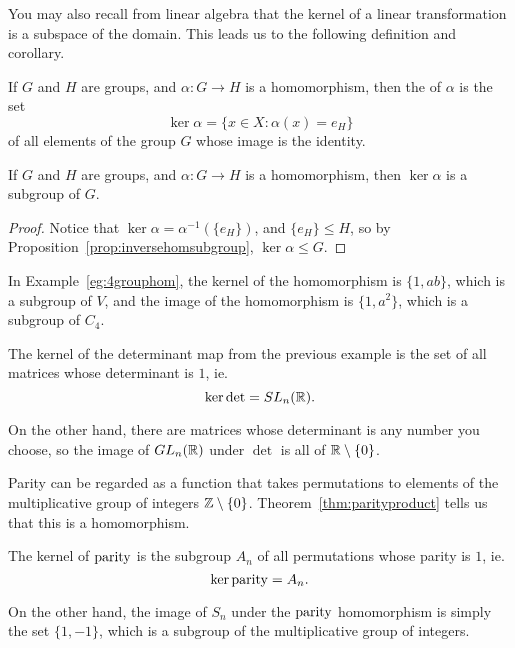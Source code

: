 You may also recall from linear algebra that the kernel of a linear
transformation is a subspace of the domain.  This leads us to the
following definition and corollary.

\begin{definition}
  If $G$ and $H$ are groups, and $\alpha: G \to H$ is a homomorphism, 
  then the  of $\alpha$ is the set
  \[
    \ker \alpha = \{ x \in X : \alpha(x) = e_{H} \}
  \]
  of all elements of the group $G$ whose image is the identity.
\end{definition}

\begin{corollary}
  If $G$ and $H$ are groups, and $\alpha: G \to H$ is a homomorphism, 
  then $\ker \alpha$ is a subgroup of $G$.
\end{corollary}
\begin{proof}
  Notice that $\ker \alpha = \alpha^{-1}(\{e_{H}\})$, and $\{e_{H}\} \le H$, so
  by Proposition~\ref{prop:inversehomsubgroup}, $\ker \alpha \le G$.
\end{proof}

\begin{example}
  In Example~\ref{eg:4grouphom}, the kernel of the homomorphism is $\{1, ab\}$,
  which is a subgroup of $V$, and the image of the homomorphism is $\{1, a^{2}\}$,
  which is a subgroup of $C_{4}$.
\end{example}

\begin{example}
  The kernel of the determinant map from the previous example is the set
  of all matrices whose determinant is $1$, ie.
  \[
    \ker \det = SL_{n}(\mathbb{R}).
  \]
  
  On the other hand, there are matrices whose determinant is any number you
  choose, so the image of $GL_{n}(\mathbb{R})$ under $\det$ is all of $\mathbb{R} 
  \setminus \{0\}$.
\end{example}

\begin{example}
  Parity can be regarded as a function that takes permutations to elements
  of the multiplicative group of integers $\mathbb{Z} \setminus \{0\}$.
  Theorem~\ref{thm:parityproduct} tells us that this is a homomorphism.
  
  The kernel of $\operatorname{parity}$ is the subgroup $A_{n}$ of all permutations
  whose parity is $1$, ie.
  \[
    \ker \operatorname{parity} = A_{n}.
  \]
  
  On the other hand, the image of $S_{n}$ under the $\operatorname{parity}$ homomorphism
  is simply the set $\{1, -1\}$, which is a subgroup of the multiplicative
  group of integers.
\end{example}

